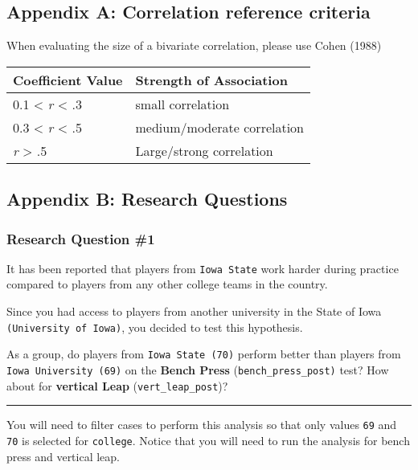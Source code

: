 \documentclass[
]{article}
\begin{document}
\hypertarget{appendix-a}{%
\subsection{Appendix A: Correlation reference criteria}\label{appendix-a}}

When evaluating the size of a bivariate correlation, please use Cohen (1988)

\begin{longtable}[]{@{}ll@{}}
\toprule
Coefficient Value & Strength of Association \\
\midrule
\endhead
0.1 \textless{} \emph{r} \textless{} .3 & small correlation \\
0.3 \textless{} \emph{r} \textless{} .5 & medium/moderate correlation \\
\emph{r} \textgreater{} .5 & Large/strong correlation \\
\bottomrule
\end{longtable}

\hypertarget{appendix-b}{%
\subsection{Appendix B: Research Questions}\label{appendix-b}}

\hypertarget{research-question-1}{%
\subsubsection{Research Question \#1}\label{research-question-1}}

It has been reported that players from \texttt{Iowa\ State} work harder during practice compared to players from any other college teams in the country.

Since you had access to players from another university in the State of Iowa \texttt{(University\ of\ Iowa)}, you decided to test this hypothesis.

As a group, do players from \texttt{Iowa\ State\ (70)} perform better than players from \texttt{Iowa\ University\ (69)} on the \textbf{Bench Press} (\texttt{bench\_press\_post)} test? How about for \textbf{vertical Leap} (\texttt{vert\_leap\_post})?

\begin{center}\rule{0.5\linewidth}{0.5pt}\end{center}

You will need to filter cases to perform this analysis so that only values \texttt{69} and \texttt{70} is selected for \texttt{college}. Notice that you will need to run the analysis for bench press and vertical leap.
\end{document}

